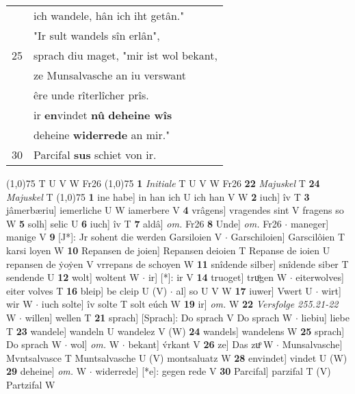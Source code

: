 \documentclass[8pt,a4paper,notitlepage]{article}
\begin{document}
\begin{table}[ht]
\begin{minipage}[t]{0.5\linewidth}
\begin{tabular}{rl}
 & ich wandele, hân ich iht getân."\\ 
 & "Ir sult wandels sîn erlân",\\ 
25 & sprach diu maget, "mir ist wol bekant,\\ 
 & ze Munsalvasche an iu verswant\\ 
 & êre unde rîterlîcher prîs.\\ 
 & ir \textbf{en}vindet \textbf{nû} \textbf{deheine wîs}\\ 
 & deheine \textbf{widerrede} an mir."\\ 
30 & Parcifal \textbf{sus} schiet von ir.\\ 
\end{tabular}
\scriptsize
\line(1,0){75} \newline
T U V W Fr26 \newline
\line(1,0){75} \newline
\textbf{1} \textit{Initiale} T U V W Fr26  \textbf{22} \textit{Majuskel} T  \textbf{24} \textit{Majuskel} T  \newline
\line(1,0){75} \newline
\textbf{1} ine habe] in han ich U ich han V W \textbf{2} iuch] îv T \textbf{3} jâmerbæriu] iemerliche U W iamerbere V \textbf{4} vrâgens] vragendes sint V fragens so W \textbf{5} solh] selic U \textbf{6} iuch] îv T \textbf{7} aldâ] \textit{om.} Fr26 \textbf{8} Unde] \textit{om.} Fr26  $\cdot$ maneger] manige V \textbf{9} [J*]: Jr sohent die werden Garsiloien V  $\cdot$ Garschiloien] Garscilôien T karsi loyen W \textbf{10} Repansen de joien] Repansen deioien T Repanse de ioien U repansen de ẏoẏen V vrrepans de schoyen W \textbf{11} snîdende silber] snîdende siber T sendende U \textbf{12} wolt] woltent W  $\cdot$ ir] [*]: ir V \textbf{14} truoget] truͦgen W  $\cdot$ eiterwolves] eiter volves T \textbf{16} bleip] be cleip U (V)  $\cdot$ al] so U V W \textbf{17} iuwer] Vwert U  $\cdot$ wirt] wir W  $\cdot$ iuch solte] îv solte T solt eúch W \textbf{19} ir] \textit{om.} W \textbf{22} \textit{Versfolge 255.21-22} W   $\cdot$ willen] wellen T \textbf{21} sprach] [Sprach]: Do sprach V Do sprach W  $\cdot$ liebiu] liebe T \textbf{23} wandele] wandeln U wandelez V (W) \textbf{24} wandels] wandelens W \textbf{25} sprach] Do sprach W  $\cdot$ wol] \textit{om.} W  $\cdot$ bekant] v́rkant V \textbf{26} ze] Das zuͦ W  $\cdot$ Munsalvasche] Mvntsalvasce T Muntsalvasche U (V) montsaluatz W \textbf{28} envindet] vindet U (W) \textbf{29} deheine] \textit{om.} W  $\cdot$ widerrede] [*e]: gegen rede V \textbf{30} Parcifal] parzifal T (V) Partzifal W \newline
\end{minipage}
\end{table}
\end{document}
